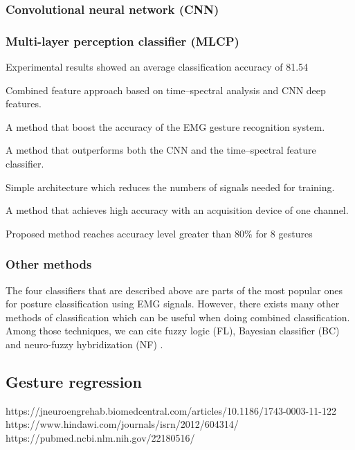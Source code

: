 \documentclass{article}
\begin{document}
\subsubsection{Convolutional neural network (CNN)}



\subsubsection{Multi-layer perception classifier (MLCP)}

Experimental results showed an average classification accuracy of 81.54%

Combined feature approach based on time–spectral analysis and CNN deep features.

A method that boost the accuracy of the EMG gesture recognition system.

A method that outperforms both the CNN and the time–spectral feature classifier.

Simple architecture which reduces the numbers of signals needed for training.

A method that achieves high accuracy with an acquisition device of one channel.

Proposed method reaches accuracy level greater than 80\% for 8 gestures

\subsubsection{Other methods}

The four classifiers that are described above are parts of the most popular ones for posture classification using EMG signals. However, there exists many other methods of classification which can be useful when doing combined classification. Among those techniques, we can cite fuzzy logic (FL), Bayesian classifier (BC) and neuro-fuzzy hybridization (NF) \cite{ref:classification3}.


\subsection{Gesture regression }

https://jneuroengrehab.biomedcentral.com/articles/10.1186/1743-0003-11-122
https://www.hindawi.com/journals/isrn/2012/604314/
https://pubmed.ncbi.nlm.nih.gov/22180516/
\end{document}
